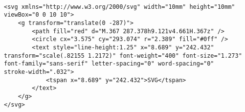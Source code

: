 \begin{verbatim}

<svg xmlns="http://www.w3.org/2000/svg" width="10mm" height="10mm" 
viewBox="0 0 10 10">
    <g transform="translate(0 -287)">
        <path fill="red" d="M.367 287.378h9.121v4.661H.367z" />
        <circle cx="3.575" cy="293.074" r="2.389" fill="#0ff" />
        <text style="line-height:1.25" x="8.689" y="242.432" 
transform="scale(.82155 1.2172)" font-weight="400" font-size="1.273" 
font-family="sans-serif" letter-spacing="0" word-spacing="0" 
stroke-width=".032">
            <tspan x="8.689" y="242.432">SVG</tspan>
        </text>
    </g>
</svg>


\end{verbatim}